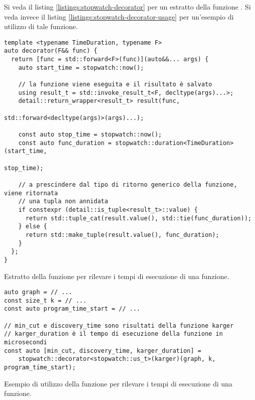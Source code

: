 Si veda il listing \ref{listings:stopwatch-decorator} per un estratto della funzione .
Si veda invece il listing \ref{listings:stopwatch-decorator-usage} per un'esempio di utilizzo di tale funzione.

\begin{listing}[!ht]
\begin{verbatim}
template <typename TimeDuration, typename F>
auto decorator(F&& func) {
  return [func = std::forward<F>(func)](auto&&... args) {
    auto start_time = stopwatch::now();
    
    // la funzione viene eseguita e il risultato è salvato
    using result_t = std::invoke_result_t<F, decltype(args)...>;
    detail::return_wrapper<result_t> result(func,
                                            std::forward<decltype(args)>(args)...);

    const auto stop_time = stopwatch::now();
    const auto func_duration = stopwatch::duration<TimeDuration>(start_time,
                                                                 stop_time);

    // a prescindere dal tipo di ritorno generico della funzione, viene ritornata
    // una tupla non annidata
    if constexpr (detail::is_tuple<result_t>::value) {
      return std::tuple_cat(result.value(), std::tie(func_duration));
    } else {
      return std::make_tuple(result.value(), func_duration);
    }
  };
}
\end{verbatim}
\caption{Estratto della funzione  per rilevare i tempi di esecuzione di una funzione.}
\label{listings:stopwatch-decorator}
\end{listing}


\begin{listing}[!ht]
\begin{verbatim}
auto graph = // ...
const size_t k = // ...
const auto program_time_start = // ...

// min_cut e discovery_time sono risultati della funzione karger
// karger_duration è il tempo di esecuzione della funzione in microsecondi
const auto [min_cut, discovery_time, karger_duration] =
    stopwatch::decorator<stopwatch::us_t>(karger)(graph, k, program_time_start);

\end{verbatim}
\caption{Esempio di utilizzo della funzione  per rilevare i tempi di esecuzione di una funzione.}
\label{listings:stopwatch-decorator-usage}
\end{listing}

